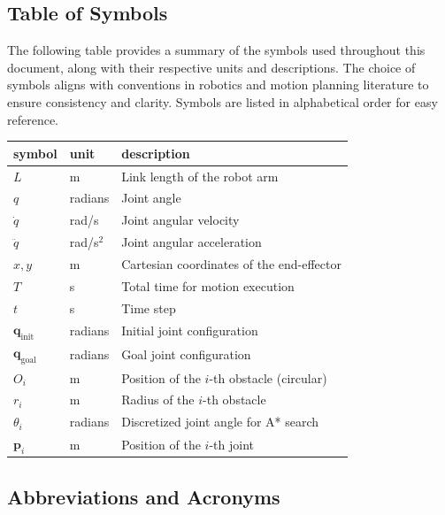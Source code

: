 \documentclass[12pt]{article}
\begin{document}
\subsection{Table of Symbols}

The following table provides a summary of the symbols used throughout this document, along with their respective units and descriptions. The choice of symbols aligns with conventions in robotics and motion planning literature to ensure consistency and clarity. Symbols are listed in alphabetical order for easy reference.

\renewcommand{\arraystretch}{1.2}
\noindent \begin{longtable*}{l l p{12cm}} \toprule
\textbf{symbol} & \textbf{unit} & \textbf{description}\\
\midrule 
\( L \) & \si{\metre} & Link length of the robot arm \\
\( q \) & radians & Joint angle \\
\( \dot{q} \) & rad/s & Joint angular velocity \\
\( \ddot{q} \) & rad/s\(^2\) & Joint angular acceleration \\
\( x, y \) & \si{\metre} & Cartesian coordinates of the end-effector \\
\( T \) & \si{\second} & Total time for motion execution \\
\( t \) & \si{\second} & Time step \\
\( \mathbf{q}_{\text{init}} \) & radians & Initial joint configuration \\
\( \mathbf{q}_{\text{goal}} \) & radians & Goal joint configuration \\
\( O_i \) & \si{\metre} & Position of the \(i\)-th obstacle (circular) \\
\( r_i \) & \si{\metre} & Radius of the \(i\)-th obstacle \\
\( \theta_i \) & radians & Discretized joint angle for A* search \\
\( \mathbf{p}_i \) & \si{\metre} & Position of the \(i\)-th joint \\

\bottomrule
\end{longtable*}


\subsection{Abbreviations and Acronyms}
\end{document}
